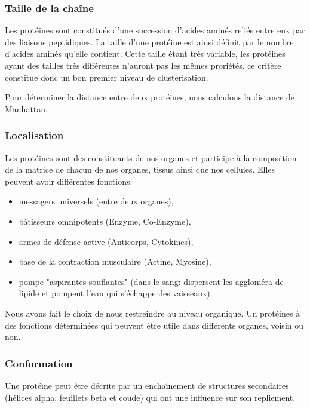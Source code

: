 \subsubsection*{Taille de la chaîne}
Les protéines sont constitués d'une succession d'acides aminés reliés entre eux par des liaisons peptidiques. La taille d'une protéine est ainsi définit par le nombre d'acides aminés qu'elle contient. Cette taille étant très variable, les protéines ayant des tailles très différentes n'auront pas les m\^emes proriétés, ce critère constitue donc un bon premier niveau de clusterisation.

Pour déterminer la distance entre deux protéines, nous calculons la distance de Manhattan.%



\subsubsection*{Localisation}
Les protéines sont des constituants de nos organes et participe à la composition de la matrice de chacun de nos organes, tissus ainsi que nos cellules. Elles peuvent avoir différentes fonctions:
\begin{itemize}
\item messagers universels (entre deux organes),
\item bâtisseurs omnipotents (Enzyme, Co-Enzyme),
\item armes de défense active (Anticorps, Cytokines),
\item base de la contraction musculaire (Actine, Myosine),  
\item pompe "aspirantes-souflantes" (dans le sang: dispersent les aggloméra de lipide et pompent l'eau qui s'échappe des vaisseaux). \\
\end{itemize}

Nous avons fait le choix de nous restreindre au niveau organique. Un protéines à des fonctions déterminées qui peuvent être utile dans différents organes, voisin ou non. \\


\subsubsection*{Conformation}
Une protéine peut être décrite par un enchaînement de structures secondaires (hélices alpha, feuillets beta et coude) qui ont une influence sur son repliement. 

